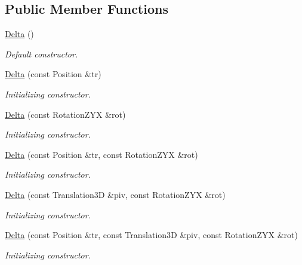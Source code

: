 \subsection*{Public Member Functions}
\begin{DoxyCompactItemize}
\item 
\hyperlink{class_d_d4hep_1_1_alignments_1_1_delta_a1db2d4fa836434f834b0bd0502bc43d7}{Delta} ()
\begin{DoxyCompactList}\small\item\em Default constructor. \item\end{DoxyCompactList}\item 
\hyperlink{class_d_d4hep_1_1_alignments_1_1_delta_a4da265200c1c24051c8861dd7f5d09f2}{Delta} (const Position \&tr)
\begin{DoxyCompactList}\small\item\em Initializing constructor. \item\end{DoxyCompactList}\item 
\hyperlink{class_d_d4hep_1_1_alignments_1_1_delta_ae692692779f93fe44ddcf501e1e4cdcd}{Delta} (const RotationZYX \&rot)
\begin{DoxyCompactList}\small\item\em Initializing constructor. \item\end{DoxyCompactList}\item 
\hyperlink{class_d_d4hep_1_1_alignments_1_1_delta_a0e678885ecb41d17d6a4d3f2ded6679e}{Delta} (const Position \&tr, const RotationZYX \&rot)
\begin{DoxyCompactList}\small\item\em Initializing constructor. \item\end{DoxyCompactList}\item 
\hyperlink{class_d_d4hep_1_1_alignments_1_1_delta_a8ade447b698a6765cf76eb5e98af91ad}{Delta} (const Translation3D \&piv, const RotationZYX \&rot)
\begin{DoxyCompactList}\small\item\em Initializing constructor. \item\end{DoxyCompactList}\item 
\hyperlink{class_d_d4hep_1_1_alignments_1_1_delta_a1694ccda25ab2214ec8145c36153ab37}{Delta} (const Position \&tr, const Translation3D \&piv, const RotationZYX \&rot)
\begin{DoxyCompactList}\small\item\em Initializing constructor. \item\end{DoxyCompactList}\item 

\end{DoxyCompactItemize}
